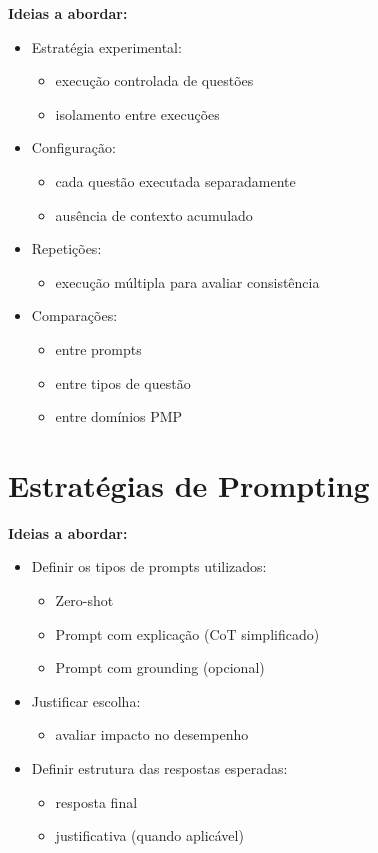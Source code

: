 \textbf{Ideias a abordar:}
\begin{itemize}
    \item Estratégia experimental:
    \begin{itemize}
        \item execução controlada de questões
        \item isolamento entre execuções
    \end{itemize}
    \item Configuração:
    \begin{itemize}
        \item cada questão executada separadamente
        \item ausência de contexto acumulado
    \end{itemize}
    \item Repetições:
    \begin{itemize}
        \item execução múltipla para avaliar consistência
    \end{itemize}
    \item Comparações:
    \begin{itemize}
        \item entre prompts
        \item entre tipos de questão
        \item entre domínios PMP
    \end{itemize}
\end{itemize}




\section{Estratégias de Prompting}
\label{subsec:prompting_proposta}

\textbf{Ideias a abordar:}
\begin{itemize}
    \item Definir os tipos de prompts utilizados:
    \begin{itemize}
        \item Zero-shot
        \item Prompt com explicação (CoT simplificado)
        \item Prompt com grounding (opcional)
    \end{itemize}
    \item Justificar escolha:
    \begin{itemize}
        \item avaliar impacto no desempenho
    \end{itemize}
    \item Definir estrutura das respostas esperadas:
    \begin{itemize}
        \item resposta final
        \item justificativa (quando aplicável)
    \end{itemize}
\end{itemize}




